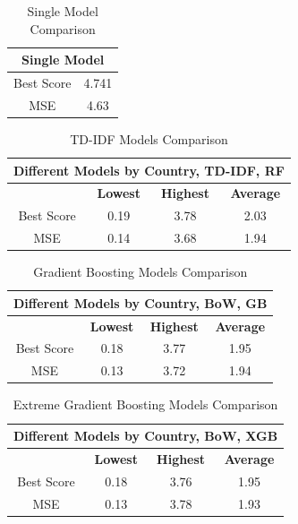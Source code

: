 \documentclass[12pt,letterpaper]{article}
\begin{document}
	\begin{table}[H]
		\centering
		\caption{Single Model Comparison}
		\begin{tabular}{|c|c|}
			\hline
			\multicolumn{2}{|c|}{\textbf{Single Model}} \\
			\hline
			Best Score & 4.741 \\
			\hline
			MSE & 4.63 \\
			\hline
		\end{tabular}
	\end{table}
	
	\begin{table}[H]
		\centering
		\caption{TD-IDF Models Comparison}
		\begin{tabular}{|c|c|c|c|}
			\hline
			\multicolumn{4}{|c|}{\textbf{Different Models by Country, TD-IDF, RF}} \\
			\hline
			& \textbf{Lowest} & \textbf{Highest} & \textbf{Average} \\
			\hline
			Best Score & 0.19 & 3.78 & 2.03 \\
			\hline
			MSE & 0.14 & 3.68 & 1.94 \\
			\hline
		\end{tabular}
	\end{table}
	
	\begin{table}[H]
		\centering
		\caption{Gradient Boosting Models Comparison}
		\begin{tabular}{|c|c|c|c|}
			\hline
			\multicolumn{4}{|c|}{\textbf{Different Models by Country, BoW, GB}} \\
			\hline
			& \textbf{Lowest} & \textbf{Highest} & \textbf{Average} \\
			\hline
			Best Score & 0.18 & 3.77 & 1.95 \\
			\hline
			MSE & 0.13 & 3.72 & 1.94 \\
			\hline
		\end{tabular}
	\end{table}
	
	\begin{table}[H]
		\centering
		\caption{Extreme Gradient Boosting Models Comparison}
		\begin{tabular}{|c|c|c|c|}
			\hline
			\multicolumn{4}{|c|}{\textbf{Different Models by Country, BoW, XGB}} \\
			\hline
			& \textbf{Lowest} & \textbf{Highest} & \textbf{Average} \\
			\hline
			Best Score & 0.18 & 3.76 & 1.95 \\
			\hline
			MSE & 0.13 & 3.78 & 1.93 \\
			\hline
		\end{tabular}
	\end{table}
	
\end{document}

